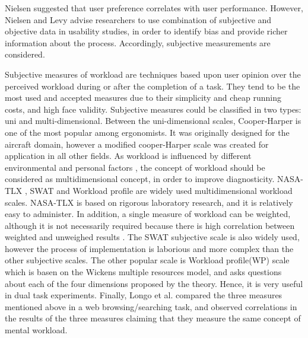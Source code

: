 \documentclass[../main/Feedback.tex]{subfiles}
\begin{document}
Nielsen \cite{nielsen1994measuring} suggested that user preference correlates with user performance.
However, Nielsen and Levy \cite{nielsen1994measuring} advise researchers to use combination of subjective and objective data in usability studies, in order to identify bias and provide richer information about the process. Accordingly, subjective measurements are considered.

Subjective measures of workload are techniques based upon user opinion over the perceived workload during or after the completion of a task.
They tend to be the most used and accepted measures due to their simplicity and cheap running costs, and high face validity.
Subjective measures could be classified in two types: uni and multi-dimensional.
Between the uni-dimensional scales, Cooper-Harper \cite{cooper1969use} is one of the most popular among ergonomists.
It was originally designed for the aircraft domain, however a modified cooper-Harper scale\cite{wierwille1983validated} was created for application in all other fields.
As workload is influenced by different environmental and personal factors \cite{rouse1993modeling}, the concept of workload should be considered as multidimensional concept, in order to improve diagnosticity.
NASA-TLX \cite{nasatlx}, SWAT \cite{reid1988subjective} and Workload profile \cite{tsang1996diagnosticity} are widely used multidimensional workload scales.
NASA-TLX is based on rigorous laboratory research, and it is relatively easy to administer.
In addition, a single measure of workload can be weighted, although it is not necessarily required because there is high correlation between weighted and unweighed results \cite{byers1988workload}.
The SWAT subjective scale is also widely used, however the process of implementation is laborious and more complex than the other subjective scales.
The other popular scale is Workload profile(WP) \cite{tsang1996diagnosticity} scale which is basen on the Wickens multiple resources model, and asks questions about each of the four dimensions proposed by the theory.
Hence, it is very useful in dual task experiments. Finally, Longo et al. \cite{longo2012importance} compared the three measures mentioned above in a web browsing/searching task, and observed correlations in the results of the three measures claiming that they measure the same concept of mental workload.\\




\end{document}
